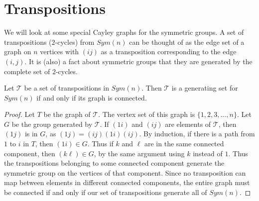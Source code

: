 \section*{Transpositions}

We will look at some special Cayley graphs for the symmetric groups.  A set of transpositions ($2$-cycles) from $Sym(n)$ can be thought of as the edge set of a graph on $n$ vertices with $(ij)$ as a transposition corresponding to the edge $(i,j)$.  It is (also) a fact about symmetric groups that they are generated by the complete set of $2$-cycles.


\begin{lemma}
	Let $\mathcal{T}$ be a set of transpositions in $Sym(n)$.  Then $\mathcal{T}$ is a generating set for $Sym(n)$ if and only if its graph is connected.
\end{lemma}
\begin{proof}
	Let $T$ be the graph of $\mathcal{T}$.  The vertex set of this graph is $\{1,2,3,\dots,n\}$.  Let $G$ be the group generated by $\mathcal{T}$.  If $(1i)$ and $(ij)$ are elements of $\mathcal{T}$, then $(1j)$ is in $G$, as $(1j)=(ij)(1i)(ij)$.  By induction, if there is a path from $1$ to $i$ in $T$, then $(1i)\in G$.  Thus if $k$ and $\ell$ are in the same connected component, then $(k\ell)\in G$, by the same argument using $k$ instead of $1$.  Thus the transpositions belonging to some connected component generate the symmetric group on the vertices of that component.  Since no transposition can map between elements in different connected components, the entire graph must be connected if and only if our set of transpositions generate all of $Sym(n)$.
\end{proof}

